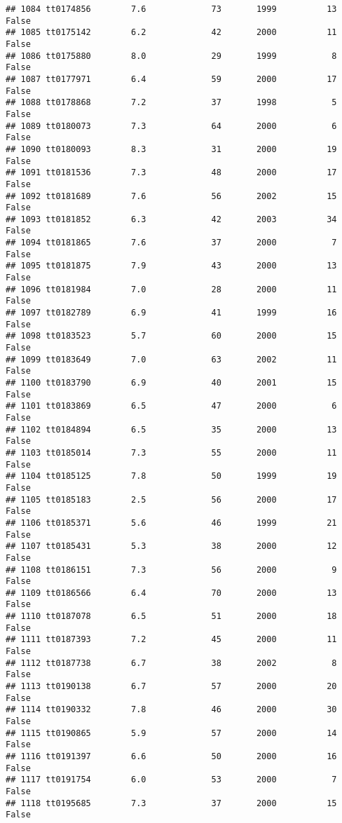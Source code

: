 \documentclass[
]{article}
\begin{document}
\begin{verbatim}
## 1084 tt0174856        7.6             73       1999          13   False
## 1085 tt0175142        6.2             42       2000          11   False
## 1086 tt0175880        8.0             29       1999           8   False
## 1087 tt0177971        6.4             59       2000          17   False
## 1088 tt0178868        7.2             37       1998           5   False
## 1089 tt0180073        7.3             64       2000           6   False
## 1090 tt0180093        8.3             31       2000          19   False
## 1091 tt0181536        7.3             48       2000          17   False
## 1092 tt0181689        7.6             56       2002          15   False
## 1093 tt0181852        6.3             42       2003          34   False
## 1094 tt0181865        7.6             37       2000           7   False
## 1095 tt0181875        7.9             43       2000          13   False
## 1096 tt0181984        7.0             28       2000          11   False
## 1097 tt0182789        6.9             41       1999          16   False
## 1098 tt0183523        5.7             60       2000          15   False
## 1099 tt0183649        7.0             63       2002          11   False
## 1100 tt0183790        6.9             40       2001          15   False
## 1101 tt0183869        6.5             47       2000           6   False
## 1102 tt0184894        6.5             35       2000          13   False
## 1103 tt0185014        7.3             55       2000          11   False
## 1104 tt0185125        7.8             50       1999          19   False
## 1105 tt0185183        2.5             56       2000          17   False
## 1106 tt0185371        5.6             46       1999          21   False
## 1107 tt0185431        5.3             38       2000          12   False
## 1108 tt0186151        7.3             56       2000           9   False
## 1109 tt0186566        6.4             70       2000          13   False
## 1110 tt0187078        6.5             51       2000          18   False
## 1111 tt0187393        7.2             45       2000          11   False
## 1112 tt0187738        6.7             38       2002           8   False
## 1113 tt0190138        6.7             57       2000          20   False
## 1114 tt0190332        7.8             46       2000          30   False
## 1115 tt0190865        5.9             57       2000          14   False
## 1116 tt0191397        6.6             50       2000          16   False
## 1117 tt0191754        6.0             53       2000           7   False
## 1118 tt0195685        7.3             37       2000          15   False

\end{verbatim}
\end{document}
